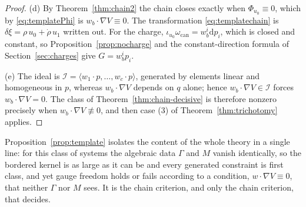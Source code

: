 \documentclass[12pt]{article}
\theoremstyle{plain}
\theoremstyle{definition}
\theoremstyle{remark}
\newcommand{\dd}{\mathrm{d}}
\newcommand{\Ical}{\mathcal{I}}
\newcommand{\gen}[1]{\langle #1\rangle}
\begin{document}
\begin{proof}
		(d) By Theorem~\ref{thm:chain2} the chain closes exactly when
		$\Phi_{u_{0}}\equiv0$, which by \eqref{eq:templatePhi} is
		$w_{b}\!\cdot\!\nabla V\equiv0$. The transformation \eqref{eq:templatechain} is
		$\delta\xi=\rho\,u_{0}+\dot\rho\,u_{1}$ written out. For the charge,
		$\iota_{u_{0}}\omega_{\mathrm{can}}=w_{b}^{i}\dd p_{i}$, which is closed and
		constant, so Proposition~\ref{prop:nocharge} and the constant-direction formula
		of Section~\ref{sec:charges} give $G=w_{b}^{i}p_{i}$.
		
		(e) The ideal is $\Ical=\gen{w_{1}\!\cdot\!p,\dots,w_{c}\!\cdot\!p}$, generated
		by elements linear and homogeneous in $p$, whereas
		$w_{b}\!\cdot\!\nabla V$ depends on $q$ alone; hence
		$w_{b}\!\cdot\!\nabla V\in\Ical$ forces $w_{b}\!\cdot\!\nabla V=0$. The class of
		Theorem~\ref{thm:chain-decisive} is therefore nonzero precisely when
		$w_{b}\!\cdot\!\nabla V\not\equiv0$, and then case (3) of
		Theorem~\ref{thm:trichotomy} applies.
	\end{proof}
	
	Proposition~\ref{prop:template} isolates the content of the whole theory in a
	single line: for this class of systems the algebraic data $\Gamma$ and $M$
	vanish identically, so the bordered kernel is as large as it can be and every
	generated constraint is first class, and yet gauge freedom holds or fails
	according to a condition, $w\!\cdot\!\nabla V\equiv0$, that neither $\Gamma$ nor
	$M$ sees. It is the chain criterion, and only the chain criterion, that decides.
	
\end{document}
